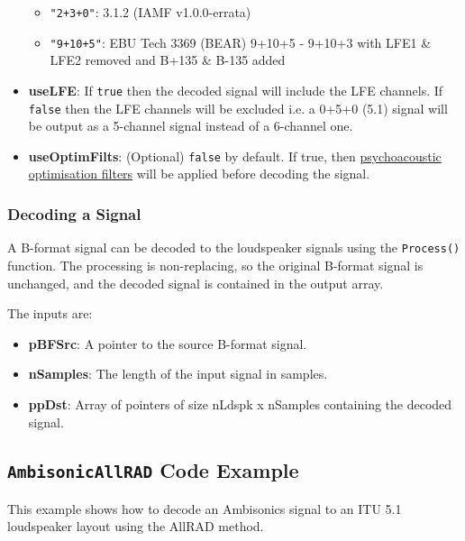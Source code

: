 \documentclass[12pt]{report}
\newcommand{\code}[1]{\texttt{#1}}
\begin{document}
\begin{itemize}
\begin{itemize}
        \item \code{"2+3+0"}: 3.1.2 (IAMF v1.0.0-errata)
        \item \code{"9+10+5"}: EBU Tech 3369 (BEAR) 9+10+5 - 9+10+3 with LFE1 \& LFE2 removed and B+135 \& B-135 added
    \end{itemize}
    \item \textbf{useLFE}: If \code{true} then the decoded signal will include the LFE channels. If \code{false} then the LFE channels will be excluded i.e. a 0+5+0 (5.1) signal will be output as a 5-channel signal instead of a 6-channel one.
    \item \textbf{useOptimFilts}: (Optional) \code{false} by default. If true, then \href{AmbisonicOptimsiation.md}{psychoacoustic optimisation filters} will be applied before decoding the signal.
\end{itemize}

\subsubsection{Decoding a Signal}

A B-format signal can be decoded to the loudspeaker signals using the \code{Process()} function. The processing is non-replacing, so the original B-format signal is unchanged, and the decoded signal is contained in the output array.

The inputs are:
\begin{itemize}
    \item \textbf{pBFSrc}: A pointer to the source B-format signal.
    \item \textbf{nSamples}: The length of the input signal in samples.
    \item \textbf{ppDst}: Array of pointers of size nLdspk x nSamples containing the decoded signal.
\end{itemize}

\subsection{\code{AmbisonicAllRAD} Code Example}

This example shows how to decode an Ambisonics signal to an ITU 5.1 loudspeaker layout using the AllRAD method.
\end{document}
